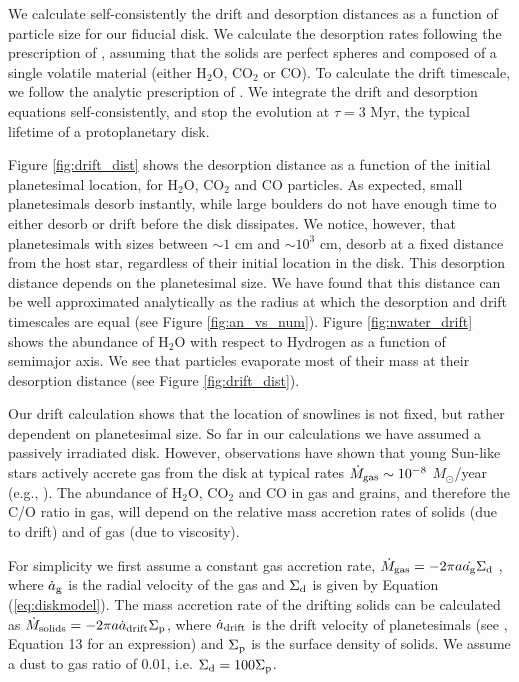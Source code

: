 \documentclass[12pt, preprint]{aastex}
\begin{document}
We calculate self-consistently the drift and desorption distances as a function of particle size for our fiducial disk. We calculate the desorption rates following the prescription of \citet{hollenbach09}, assuming that the solids are perfect spheres and composed of a single volatile material (either H$_2$O, CO$_2$ or CO). To calculate the drift timescale, we follow the analytic prescription of \citet{chiang10}. We integrate the drift and desorption equations self-consistently, and stop the evolution at $\tau=3$ Myr, the typical lifetime of a protoplanetary disk. 


Figure \ref{fig:drift_dist} shows the desorption distance as a function of the initial planetesimal location, for H$_2$O, CO$_2$ and CO particles. As expected, small planetesimals desorb instantly, while large boulders do not have enough time to either desorb or drift before the disk dissipates. We notice, however, that planetesimals with sizes between $\sim 1$ cm and $\sim 10^3$ cm, desorb at a fixed distance from the host star, regardless of their initial location in the disk. This desorption distance depends on the planetesimal size. We have found that this distance can be well approximated analytically as the radius at which the desorption and drift timescales are equal (see Figure \ref{fig:an_vs_num}). Figure \ref{fig:nwater_drift} shows the abundance of H$_2$O with respect to Hydrogen as a function of semimajor axis. We see that particles evaporate most of their mass at their desorption distance (see Figure \ref{fig:drift_dist}). 



Our drift calculation shows that the location of snowlines is not fixed, but rather dependent on planetesimal size. So far in our calculations we have assumed a passively irradiated disk. However, observations have shown that young Sun-like stars actively accrete gas from the disk at typical rates $\dot{M}_{\rm gas} \sim 10^{-8}$ $M_{\odot}$/year (e.g., \citealt{hartmann06}). The abundance of H$_2$O, CO$_2$ and CO in gas and grains, and therefore the C/O ratio in gas, will depend on the relative mass accretion rates of solids (due to drift) and of gas (due to viscosity).

For simplicity we first assume a constant gas accretion rate, $\dot{M}_{\rm gas}=-2 \pi a \dot{a_{\rm g}} \Sigma_{\rm d}$ , where $\dot{a}_{\rm g}$ is the radial velocity of the gas and $\Sigma_{\rm d}$ is given by Equation (\ref{eq:diskmodel}). The mass accretion rate of the drifting solids can be calculated as $\dot{M}_{\rm solids} = - 2 \pi a \dot{a}_{\rm drift} \Sigma_{\rm p}$, where $\dot{a}_{\rm drift}$ is the drift velocity of planetesimals (see \citealt{chiang10}, Equation 13 for an expression) and $\Sigma_{\rm p}$ is the surface density of solids. We assume a dust to gas ratio of 0.01, i.e. $\Sigma_{\rm d}=100 \Sigma_{\rm p}$. 
\end{document}
